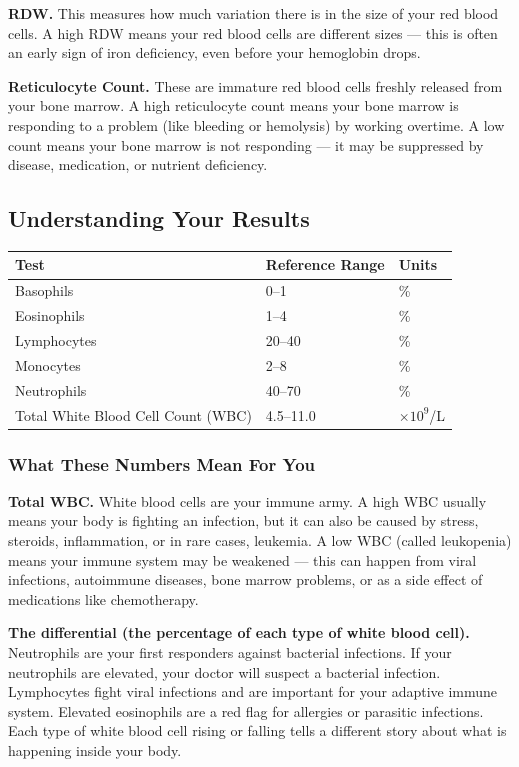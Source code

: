 \textbf{RDW.} This measures how much variation there is in the size of your red blood cells. A high RDW means your red blood cells are different sizes --- this is often an early sign of iron deficiency, even before your hemoglobin drops.

\textbf{Reticulocyte Count.} These are immature red blood cells freshly released from your bone marrow. A high reticulocyte count means your bone marrow is responding to a problem (like bleeding or hemolysis) by working overtime. A low count means your bone marrow is not responding --- it may be suppressed by disease, medication, or nutrient deficiency.

\subsection{Understanding Your Results}

\begin{longtable}{@{}lll@{}}
\toprule
\textbf{Test} & \textbf{Reference Range} & \textbf{Units} \\
\midrule
Basophils & 0--1 & \% \\
Eosinophils & 1--4 & \% \\
Lymphocytes & 20--40 & \% \\
Monocytes & 2--8 & \% \\
Neutrophils & 40--70 & \% \\
Total White Blood Cell Count (WBC) & 4.5--11.0 & $\times 10^9$/L \\
\bottomrule
\end{longtable}

\subsubsection{What These Numbers Mean For You}

\textbf{Total WBC.} White blood cells are your immune army. A high WBC usually means your body is fighting an infection, but it can also be caused by stress, steroids, inflammation, or in rare cases, leukemia. A low WBC (called leukopenia) means your immune system may be weakened --- this can happen from viral infections, autoimmune diseases, bone marrow problems, or as a side effect of medications like chemotherapy.

\textbf{The differential (the percentage of each type of white blood cell).} Neutrophils are your first responders against bacterial infections. If your neutrophils are elevated, your doctor will suspect a bacterial infection. Lymphocytes fight viral infections and are important for your adaptive immune system. Elevated eosinophils are a red flag for allergies or parasitic infections. Each type of white blood cell rising or falling tells a different story about what is happening inside your body.

